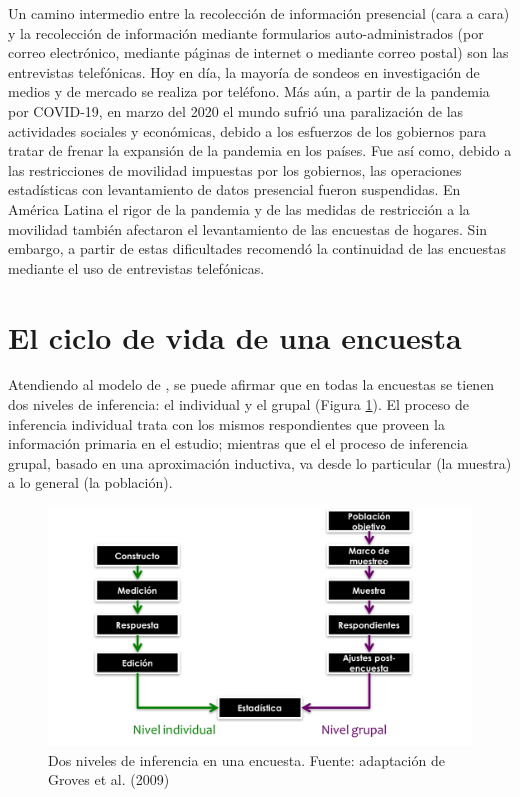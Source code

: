 \documentclass[
  12pt,
]{book}
\begin{document}
Un camino intermedio entre la recolección de información presencial (cara a cara) y la recolección de información mediante formularios auto-administrados (por correo electrónico, mediante páginas de internet o mediante correo postal) son las entrevistas telefónicas. Hoy en día, la mayoría de sondeos en investigación de medios y de mercado se realiza por teléfono. Más aún, a partir de la pandemia por COVID-19, en marzo del 2020 el mundo sufrió una paralización de las actividades sociales y económicas, debido a los esfuerzos de los gobiernos para tratar de frenar la expansión de la pandemia en los países. Fue así como, debido a las restricciones de movilidad impuestas por los gobiernos, las operaciones estadísticas con levantamiento de datos presencial fueron suspendidas. En América Latina el rigor de la pandemia y de las medidas de restricción a la movilidad también afectaron el levantamiento de las encuestas de hogares. Sin embargo, a partir de estas dificultades \citet{CEPAL_continua} recomendó la continuidad de las encuestas mediante el uso de entrevistas telefónicas.

\hypertarget{el-ciclo-de-vida-de-una-encuesta}{%
\section{El ciclo de vida de una encuesta}\label{el-ciclo-de-vida-de-una-encuesta}}

Atendiendo al modelo de \citet{Groves_Fowler_Couper_Lepkowski_Singer_Tourangeau_2009}, se puede afirmar que en todas la encuestas se tienen dos niveles de inferencia: el individual y el grupal (Figura \ref{fig:figinferencias}). El proceso de inferencia individual trata con los mismos respondientes que proveen la información primaria en el estudio; mientras que el el proceso de inferencia grupal, basado en una aproximación inductiva, va desde lo particular (la muestra) a lo general (la población).

\begin{figure}
\includegraphics[width=17.03in]{Pics/Picture6} \caption{Dos niveles de inferencia en una encuesta. Fuente: adaptación de Groves et al. (2009)}\label{fig:figinferencias}
\end{figure}
\end{document}
